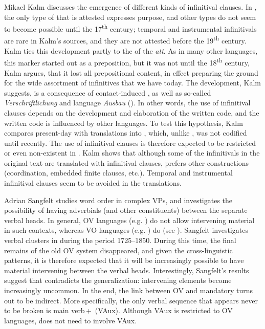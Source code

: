 \documentclass[output=paper]{langscibook}
\begin{document}
Mikael Kalm discusses the emergence of different kinds of  infinitival clauses. In , the only type of   that is attested expresses purpose, and other types do not seem to become possible until the 17\textsuperscript{th} century; temporal and instrumental  infinitivals are rare in Kalm’s sources, and they are not attested before the 19\textsuperscript{th} century. Kalm ties this development partly to the  of the  \textit{att}. As in many other  languages, this marker started out as a preposition, but it was not until the 18\textsuperscript{th} century, Kalm argues, that it lost all prepositional content, in effect preparing the ground for the wide assortment of  infinitives that we have today. The development, Kalm suggests, is a consequence of contact-induced , as well as so-called \textit{Verschriftlichung} and language \textit{Ausbau} (\citealt{Hoder2009, Hoder2010}). In other words, the use of  infinitival clauses depends on the development and elaboration of the written code, and the  written code is influenced by other languages. To test this hypothesis, Kalm compares present-day  with translations into , which, unlike , was not codified until recently. The use of  infinitival clauses is therefore expected to be restricted or even non-existent in . Kalm shows that although some of the  infinitivals in the  original text are translated with infinitival clauses,  prefers other constructions (coordination, embedded finite clauses, etc.). Temporal and instrumental infinitival clauses seem to be avoided in the  translations.



Adrian Sangfelt studies word order in complex VPs, and investigates the possibility of having adverbials (and other constituents) between the separate verbal heads. In general, OV languages (e.g. ) do not allow intervening material in such contexts, whereas VO languages (e.g. ) do (see \citealt{Haider2010,Haider2013}). Sangfelt investigates verbal clusters in  during the period 1725–1850. During this time, the final remains of the old OV system disappeared, and given the cross-linguistic patterns, it is therefore expected that it will be increasingly possible to have material intervening between the verbal heads. Interestingly, Sangfelt’s results suggest that  contradicts the generalization: intervening elements become increasingly uncommon. In the end, the link between OV and mandatory  turns out to be indirect. More specifically, the only verbal sequence that appears never to be broken is main verb\,+\, (VAux). Although VAux is restricted to OV languages,  does not need to involve VAux.
\end{document}
